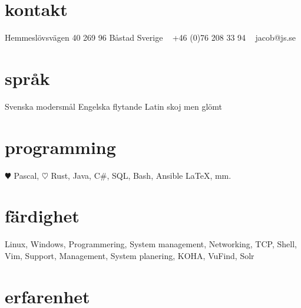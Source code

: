 \documentclass[]{cv-style}          %
\begin{document}
\lastupdated


\begin{aside}
%
\section{kontakt}
Hemmeslövsvägen 40
269 96 Båstad
Sverige
~
+46 (0)76 208 33 94
~
jacob@js.se
%
\section{språk}
Svenska modersmål
Engelska flytande
Latin skoj men glömt
%
\section{programming}
{\color{red} $\varheartsuit$} Pascal, {\color{red} $\heartsuit$} Rust, Java, C\#, SQL, Bash, {\color{orange} }Ansible
\LaTeX{}, mm.
%
\end{aside}


\section{färdighet}
  \vspace{-0.2cm}

  Linux, Windows, Programmering, System management, Networking, TCP, Shell, Vim, Support, Management, System planering, KOHA, VuFind, Solr

\section{erfarenhet}
\end{document}
